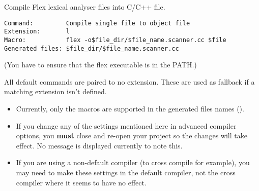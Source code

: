 
Compile Flex lexical analyser files into C/C++ file.
\begin{verbatim}
Command:         Compile single file to object file
Extension:       l
Macro:           flex -o$file_dir/$file_name.scanner.cc $file
Generated files: $file_dir/$file_name.scanner.cc
\end{verbatim}
(You have to ensure that the flex executable is in the PATH.)

    All default commands are paired to no extension. These are used as fallback if a matching extension isn't defined.

\begin{itemize}
\item Currently, only the  macros are supported in the generated files names\newline
   ().
\item If you change any of the settings mentioned here in advanced compiler options, you \textbf{must} close and re-open your project so the changes will take effect. No message is displayed currently to note this.
\item If you are using a non-default compiler (to cross compile for example), you may need to make these settings in the default compiler, not the cross compiler where it seems to have no effect.
\end{itemize}